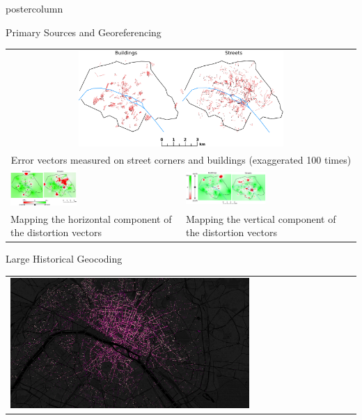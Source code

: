 \documentclass[final,hyperref={pdfpagelabels=false}]{beamer}
\begin{document}
\begin{frame}
\begin{columns}
\begin{column}{0.5\textwidth}
\begin{beamercolorbox}[center,wd=\textwidth]{postercolumn}
\begin{minipage}[t]{.98\textwidth}
\begin{block}{Primary Sources and Georeferencing}
\begin{tabular}{p{}p{}}
        \multicolumn{2}{c}{\includegraphics[width=0.6\textwidth]{figures/errorthemes.png}}\\
	\multicolumn{2}{c}{\scriptsize Error vectors measured on street corners and buildings (exaggerated 100 times)}\\
        \vspace{0pt}
        \includegraphics[width=0.4\textwidth]{figures/error_x.png}&
        \vspace{0pt}
        \hspace*{-1em}\includegraphics[width=0.48\textwidth]{figures/error_y.png}\\
	\scriptsize Mapping the horizontal component of the distortion vectors&
        \scriptsize Mapping the vertical component of the distortion vectors
      \end{tabular}
    \end{block}
    \begin{block}{Large Historical Geocoding}
      \centering
      \begin{tabular}{>{\centering}m{}}
        \includegraphics[width=0.7\textwidth]{figures/geocoding}\\

\end{tabular}
\end{block}
\end{minipage}
\end{beamercolorbox}
\end{column}
\end{columns}
\end{frame}
\end{document}
